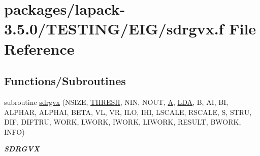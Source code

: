\hypertarget{sdrgvx_8f}{}\section{packages/lapack-\/3.5.0/\+T\+E\+S\+T\+I\+N\+G/\+E\+I\+G/sdrgvx.f File Reference}
\label{sdrgvx_8f}
\subsection*{Functions/\+Subroutines}
\begin{DoxyCompactItemize}
\item 
subroutine \hyperlink{group__single__eig_ga01b4d3586799e995efa59513c1bc9ec2}{sdrgvx} (N\+S\+I\+Z\+E, \hyperlink{zlaqgs_8c_a0656018abfc9fa2821827415f5d5ea57}{T\+H\+R\+E\+S\+H}, N\+I\+N, N\+O\+U\+T, \hyperlink{classA}{A}, \hyperlink{example__user_8c_ae946da542ce0db94dced19b2ecefd1aa}{L\+D\+A}, B, A\+I, B\+I, A\+L\+P\+H\+A\+R, A\+L\+P\+H\+A\+I, B\+E\+T\+A, V\+L, V\+R, I\+L\+O, I\+H\+I, L\+S\+C\+A\+L\+E, R\+S\+C\+A\+L\+E, S, S\+T\+R\+U, D\+I\+F, D\+I\+F\+T\+R\+U, W\+O\+R\+K, L\+W\+O\+R\+K, I\+W\+O\+R\+K, L\+I\+W\+O\+R\+K, R\+E\+S\+U\+L\+T, B\+W\+O\+R\+K, I\+N\+F\+O)
\begin{DoxyCompactList}\small\item\em {\bfseries S\+D\+R\+G\+V\+X} \end{DoxyCompactList}\end{DoxyCompactItemize}
